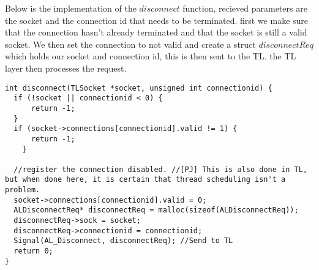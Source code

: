 Below is the implementation of the $disconnect$ function, recieved parameters are the socket and the connection id that needs to be terminated.
first we make sure that the connection hasn't already terminated and that the socket is still a valid socket.
We then set the connection to not valid and create a struct $disconnectReq$ which holds our socket and connection id, this is then sent to the TL.
the TL layer then processes the request.
\begin{lstlisting}
int disconnect(TLSocket *socket, unsigned int connectionid) {
  if (!socket || connectionid < 0) {
      return -1;
  }
  if (socket->connections[connectionid].valid != 1) {
      return -1;
    }

  //register the connection disabled. //[PJ] This is also done in TL, but when done here, it is certain that thread scheduling isn't a problem.
  socket->connections[connectionid].valid = 0;
  ALDisconnectReq* disconnectReq = malloc(sizeof(ALDisconnectReq));
  disconnectReq->sock = socket;
  disconnectReq->connectionid = connectionid;
  Signal(AL_Disconnect, disconnectReq); //Send to TL
  return 0;
}
\end{lstlisting}


